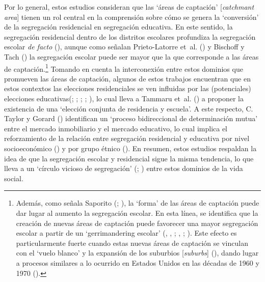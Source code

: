 \documentclass[
  spanish,
  a4paper,%
  chapterprefix=true,%
  DIV=calc,%
  twoside]{scrbook}%
\begin{document}
Por lo general, estos estudios consideran que las
`áreas de captación' {[}\emph{catchmant area}{]} tienen un rol central en la
comprensión sobre cómo se genera la `conversión' de la segregación
residencial en segregación educativa. En este sentido, la segregación
residencial dentro de los distritos escolares profundiza la segregación
escolar \emph{de facto} (), aunque como señalan
Prieto-Latorre et~al. () y Bischoff y Tach () la segregación escolar puede ser
mayor que la que corresponde a las áreas de
captación.\footnote{Además, como señala Saporito
  (; ), la `forma' de las áreas de
  captación puede dar lugar al aumento la segregación escolar. En esta
  línea, se identifica que la creación de nuevas áreas de captación
  puede favorecer una mayor segregación escolar a partir de un
  `gerrimandering escolar' (, , ; , ; ). Este efecto es particularmente fuerte cuando
  estas nuevas áreas de captación se vinculan con el `vuelo blanco' y
  la expansión de los suburbios {[}\emph{suburbs}{]} (), dando lugar
  a procesos similares a lo ocurrido en Estados Unidos en las décadas
  de 1960 y 1970
  ().}
Tomando en cuenta la
interconexión entre estos dominios que promueven las áreas de captación,
algunos de estos trabajos encuentran que en estos contextos las
elecciones residenciales se ven influidas por las (potenciales)
elecciones educativas(; ; ; ; ), lo cual lleva a Tammaru et~al. () a
proponer la existencia de una `elección conjunta de residencia y
escuela'. A este respecto, C. Taylor y Gorard () identifican un `proceso
bidireccional de determinación mutua' entre el mercado inmobiliario y el
mercado educativo, lo cual implica el reforzamiento de la relación entre
segregación residencial y educativa por nivel socioeconómico
() y por grupo étnico ().
En resumen, estos estudios respaldan la idea de
que la segregación escolar y residencial sigue la misma tendencia, lo
que lleva a un `círculo vicioso de segregación' (; ) entre estos dominios de la vida social.
\end{document}
